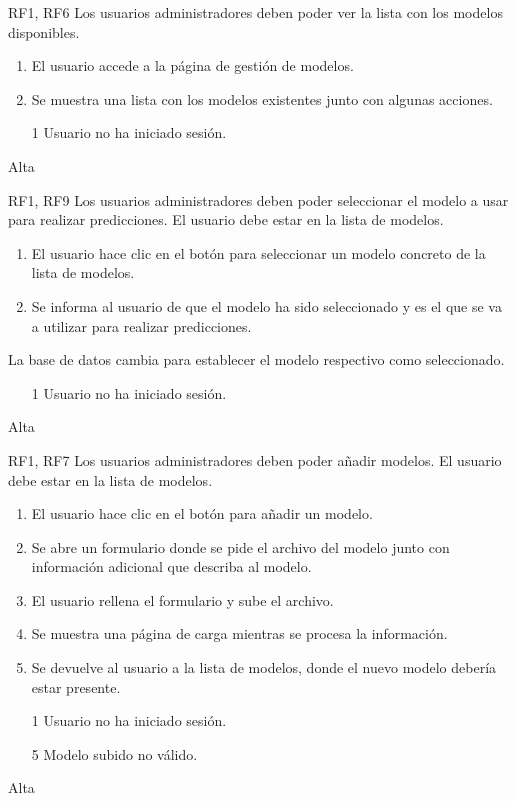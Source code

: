 {RF1, RF6}
{Los usuarios administradores deben poder ver la lista con los modelos disponibles.}
{}
{
    \begin{enumerate}
        \def\labelenumi{\arabic{enumi}.}
        \tightlist
        \item El usuario accede a la página de gestión de modelos.
        \item Se muestra una lista con los modelos existentes junto con algunas acciones.
    \end{enumerate}
}
{}
{
    \begin{itemize}
        \item [1] Usuario no ha iniciado sesión.
    \end{itemize}
}
{Alta}

{RF1, RF9}
{Los usuarios administradores deben poder seleccionar el modelo a usar para realizar predicciones.}
{El usuario debe estar en la lista de modelos.}
{
    \begin{enumerate}
        \def\labelenumi{\arabic{enumi}.}
        \tightlist
        \item El usuario hace clic en el botón para seleccionar un modelo
              concreto de la lista de modelos.
        \item Se informa al usuario de que el modelo ha sido seleccionado y es
              el que se va a utilizar para realizar predicciones.
    \end{enumerate}
}
{
    La base de datos cambia para establecer el modelo respectivo como seleccionado.
}
{
    \begin{itemize}
        \item [1] Usuario no ha iniciado sesión.
    \end{itemize}
}
{Alta}

{RF1, RF7}
{Los usuarios administradores deben poder añadir modelos.}
{El usuario debe estar en la lista de modelos.}
{
    \begin{enumerate}
        \def\labelenumi{\arabic{enumi}.}
        \tightlist
        \item El usuario hace clic en el botón para añadir un modelo.
        \item Se abre un formulario donde se pide el archivo del modelo junto
              con información adicional que describa al modelo.
        \item El usuario rellena el formulario y sube el archivo.
        \item Se muestra una página de carga mientras se procesa la información.
        \item Se devuelve al usuario a la lista de modelos, donde el nuevo
              modelo debería estar presente.
    \end{enumerate}
}
{}
{
    \begin{itemize}
        \item [1] Usuario no ha iniciado sesión.
        \item [5] Modelo subido no válido.
    \end{itemize}
}
{Alta}

